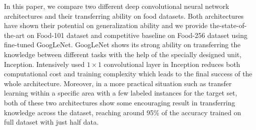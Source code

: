 In this paper, we compare two different deep convolutional neural network architectures and their transferring ability on food datasets. Both architectures have shown their potential on generalization ability and we provide the-state-of-the-art on Food-101 dataset and competitive baseline on Food-256 dataset using fine-tuned GoogLeNet. GoogLeNet shows its strong ability on transferring the knowledge between different tasks with the help of the specially designed unit, Inception. Intensively used $1\times 1$ convolutional layer in Inception reduces both computational cost and training complexity which leads to the final success of the whole architecture. Moreover, in a more practical situation such as transfer learning within a specific area with a few labeled instances for the target set, both of these two architectures show some encouraging result in transferring knowledge across the dataset, reaching around 95\% of the accuracy trained on full dataset with just half data. 